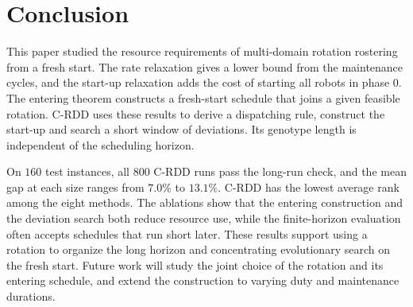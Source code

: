 \section{Conclusion}
\label{sec:conclusion}

This paper studied the resource requirements of multi-domain rotation rostering from a fresh start.
The rate relaxation gives a lower bound from the maintenance cycles, and the start-up relaxation adds the cost of starting all robots in phase $0$.
The entering theorem constructs a fresh-start schedule that joins a given feasible rotation.
C-RDD uses these results to derive a dispatching rule, construct the start-up and search a short window of deviations.
Its genotype length is independent of the scheduling horizon.

On $160$ test instances, all $800$ C-RDD runs pass the long-run check, and the mean gap at each size ranges from $7.0\%$ to $13.1\%$.
C-RDD has the lowest average rank among the eight methods.
The ablations show that the entering construction and the deviation search both reduce resource use, while the finite-horizon evaluation often accepts schedules that run short later.
These results support using a rotation to organize the long horizon and concentrating evolutionary search on the fresh start.
Future work will study the joint choice of the rotation and its entering schedule, and extend the construction to varying duty and maintenance durations.
